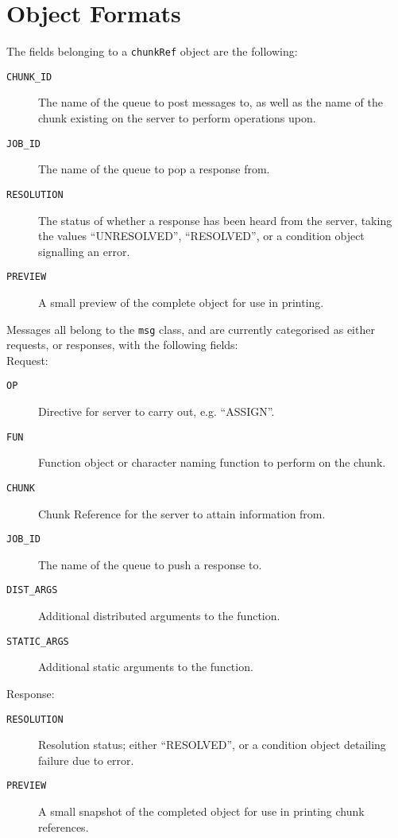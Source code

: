 \documentclass[a4paper,10pt]{article}
\begin{document}
\section{Object Formats}
The fields belonging to a \texttt{chunkRef} object are the following:
\begin{description}
	\item[\texttt{CHUNK\_ID}] The name of the queue to post messages to, as
		well as the name of the chunk existing on the server to perform
		operations upon.
	\item[\texttt{JOB\_ID}] The name of the queue to pop a response from.
	\item[\texttt{RESOLUTION}] The status of whether a response has been
		heard from the server, taking the values ``UNRESOLVED'',
		``RESOLVED'', or a condition object signalling an error.
	\item[\texttt{PREVIEW}] A small preview of the complete object for use
		in printing.
\end{description}

Messages all belong to the \texttt{msg} class, and are currently categorised as
either requests, or responses, with the following fields:\\

Request:
\begin{description}
	\item[\texttt{OP}] Directive for server to carry out, e.g. ``ASSIGN''.
	\item[\texttt{FUN}] Function object or character naming function to
		perform on the chunk.
	\item[\texttt{CHUNK}] Chunk Reference for the server to attain
		information from.
	\item[\texttt{JOB\_ID}] The name of the queue to push a response to.
	\item[\texttt{DIST\_ARGS}] Additional distributed arguments to the
		function.
	\item[\texttt{STATIC\_ARGS}] Additional static arguments to the
		function.
\end{description}

Response:
\begin{description}
	\item[\texttt{RESOLUTION}] Resolution status; either ``RESOLVED'', or a
		condition object detailing failure due to error.
	\item[\texttt{PREVIEW}]  A small snapshot of the completed object for
		use in printing chunk references.
\end{description}
\end{document}
